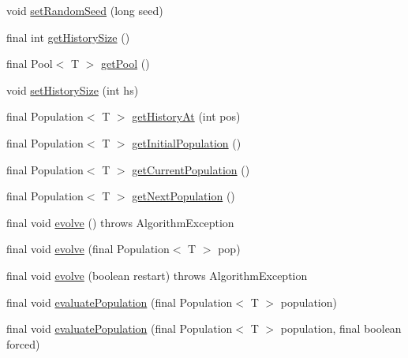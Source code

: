 \begin{CompactItemize}
\item 
void \hyperlink{classjenes_1_1_genetic_algorithm_3_01_t_01extends_01_chromosome_01_4_7e5f06abe9e8661cdb38bd0fa663da6c}{setRandomSeed} (long seed)
\item 
final int \hyperlink{classjenes_1_1_genetic_algorithm_3_01_t_01extends_01_chromosome_01_4_b52be3b0fcd2f424ae191ff4e642edf3}{getHistorySize} ()
\item 
final Pool$<$ T $>$ \hyperlink{classjenes_1_1_genetic_algorithm_3_01_t_01extends_01_chromosome_01_4_d254fc6b2ff476bc7f7837d03e677786}{getPool} ()
\item 
void \hyperlink{classjenes_1_1_genetic_algorithm_3_01_t_01extends_01_chromosome_01_4_71407144e93e7522d2d474c25781d65c}{setHistorySize} (int hs)
\item 
final Population$<$ T $>$ \hyperlink{classjenes_1_1_genetic_algorithm_3_01_t_01extends_01_chromosome_01_4_99718490498059da48833dfbdfc8076e}{getHistoryAt} (int pos)
\item 
final Population$<$ T $>$ \hyperlink{classjenes_1_1_genetic_algorithm_3_01_t_01extends_01_chromosome_01_4_b5ff704fa1d7b01bcfc5f0ca36b20e34}{getInitialPopulation} ()
\item 
final Population$<$ T $>$ \hyperlink{classjenes_1_1_genetic_algorithm_3_01_t_01extends_01_chromosome_01_4_855bc56ffb3e1704ced2fdf68cc96d8f}{getCurrentPopulation} ()
\item 
final Population$<$ T $>$ \hyperlink{classjenes_1_1_genetic_algorithm_3_01_t_01extends_01_chromosome_01_4_5d22b21350638a64a66d3599b2777982}{getNextPopulation} ()
\item 
final void \hyperlink{classjenes_1_1_genetic_algorithm_3_01_t_01extends_01_chromosome_01_4_8afdd855dc891b981cbf675c63db72c3}{evolve} ()  throws AlgorithmException 
\item 
final void \hyperlink{classjenes_1_1_genetic_algorithm_3_01_t_01extends_01_chromosome_01_4_fea32755ac446883e283d2eec6bc69fa}{evolve} (final Population$<$ T $>$ pop)
\item 
final void \hyperlink{classjenes_1_1_genetic_algorithm_3_01_t_01extends_01_chromosome_01_4_f8bb6842d525c274bfb8a3efc9ca5b23}{evolve} (boolean restart)  throws AlgorithmException 
\item 
final void \hyperlink{classjenes_1_1_genetic_algorithm_3_01_t_01extends_01_chromosome_01_4_b90dc099bae1616275779f59f400a59b}{evaluatePopulation} (final Population$<$ T $>$ population)
\item 
final void \hyperlink{classjenes_1_1_genetic_algorithm_3_01_t_01extends_01_chromosome_01_4_4a04df077e2b7752248689668889a5a5}{evaluatePopulation} (final Population$<$ T $>$ population, final boolean forced)

\end{CompactItemize}
